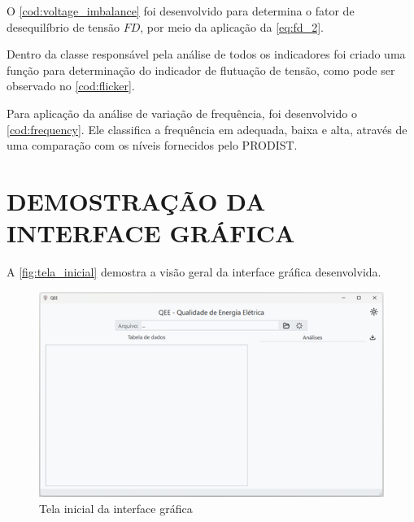 O \autoref{cod:voltage_imbalance} foi desenvolvido para determina o fator de desequilíbrio de tensão $FD$, por meio da aplicação da \autoref{eq:fd_2}.

\begin{codigo}
\end{codigo}

Dentro da classe responsável pela análise de todos os indicadores foi criado uma função para determinação do indicador de flutuação de tensão, como pode ser observado no \autoref{cod:flicker}.

\begin{codigo}
\end{codigo}


Para aplicação da análise de variação de frequência, foi desenvolvido o \autoref{cod:frequency}. Ele classifica a frequência em adequada, baixa e alta, através de uma comparação com os níveis fornecidos pelo PRODIST.

\begin{codigo}
\end{codigo}

\section{DEMOSTRAÇÃO DA INTERFACE GRÁFICA}

A \autoref{fig:tela_inicial} demostra a visão geral da interface gráfica desenvolvida.

\begin{figure}[H]
	\centering
	\caption{Tela inicial da interface gráfica}
	\label{fig:tela_inicial}
	\includegraphics[width=15cm]{illustrations/figures/tela_inicial.png}
\end{figure}

